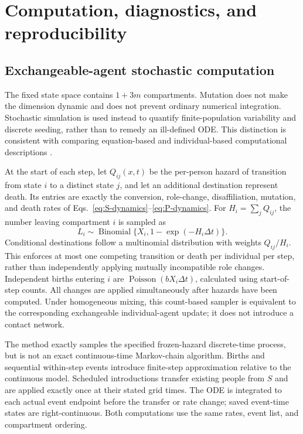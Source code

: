 \documentclass[11pt,a4paper]{article}
\begin{document}
\FloatBarrier
\appendix
\section{Computation, diagnostics, and reproducibility}
\label{app:computation}
\subsection{Exchangeable-agent stochastic computation}
The fixed state space contains $1+3m$ compartments. Mutation does not make the dimension dynamic and does not prevent ordinary numerical integration. Stochastic simulation is used instead to quantify finite-population variability and discrete seeding, rather than to remedy an ill-defined ODE. This distinction is consistent with comparing equation-based and individual-based computational descriptions \cite{macal2010agent,schimit2023multi,scheidegger2018comparison,hunter2020hybrid,lazebnik2025comparing}.

At the start of each step, let $Q_{ij}(x,t)$ be the per-person hazard of transition from state $i$ to a distinct state $j$, and let an additional destination represent death. Its entries are exactly the conversion, role-change, disaffiliation, mutation, and death rates of Eqs.~\eqref{eq:S-dynamics}--\eqref{eq:P-dynamics}. For $H_i=\sum_jQ_{ij}$, the number leaving compartment $i$ is sampled as
\begin{equation}
L_i\sim\operatorname{Binomial}\{X_i,1-\exp(-H_i\Delta t)\}.
\end{equation}
Conditional destinations follow a multinomial distribution with weights $Q_{ij}/H_i$. This enforces at most one competing transition or death per individual per step, rather than independently applying mutually incompatible role changes. Independent births entering $i$ are $\operatorname{Poisson}(bX_i\Delta t)$, calculated using start-of-step counts. All changes are applied simultaneously after hazards have been computed. Under homogeneous mixing, this count-based sampler is equivalent to the corresponding exchangeable individual-agent update; it does not introduce a contact network.

The method exactly samples the specified frozen-hazard discrete-time process, but is not an exact continuous-time Markov-chain algorithm. Births and sequential within-step events introduce finite-step approximation relative to the continuous model. Scheduled introductions transfer existing people from $S$ and are applied exactly once at their stated grid times. The ODE is integrated to each actual event endpoint before the transfer or rate change; saved event-time states are right-continuous. Both computations use the same rates, event list, and compartment ordering.
\end{document}
